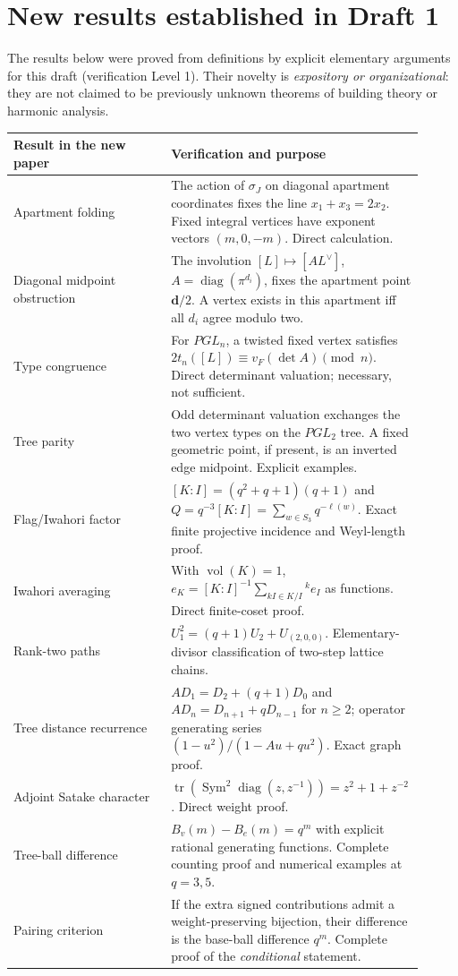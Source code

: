 \documentclass[12pt,letterpaper]{amsart}
\begin{document}
\section{New results established in Draft 1}
The results below were proved from definitions by explicit elementary
arguments for this draft (verification Level 1). Their novelty is
\emph{expository or organizational}: they are not claimed to be
previously unknown theorems of building theory or harmonic analysis.
\begin{longtable}{@{}p{0.38\linewidth}p{0.53\linewidth}@{}}
\toprule
Result in the new paper & Verification and purpose\\
\midrule
\endhead
Apartment folding & The action of $\sigma_J$ on diagonal apartment
coordinates fixes the line $x_1+x_3=2x_2$. Fixed integral vertices
have exponent vectors $(m,0,-m)$. Direct calculation.\\
Diagonal midpoint obstruction & The involution
$[L]\mapsto[A L^\vee]$, $A=\operatorname{diag}(\pi^{d_i})$,
fixes the apartment point $\boldsymbol d/2$. A vertex exists
in this apartment iff all $d_i$ agree modulo two.\\
Type congruence & For $PGL_n$, a twisted fixed vertex satisfies
$2t_n([L])\equiv v_F(\det A)\pmod n$. Direct determinant
valuation; necessary, not sufficient.\\
Tree parity & Odd determinant valuation exchanges the two
vertex types on the $PGL_2$ tree. A fixed geometric point,
if present, is an inverted edge midpoint. Explicit examples.\\
Flag/Iwahori factor & $[K:I]=(q^2+q+1)(q+1)$ and
$Q=q^{-3}[K:I]=\sum_{w\in S_3}q^{-\ell(w)}$.
Exact finite projective incidence and Weyl-length proof.\\
Iwahori averaging & With $\operatorname{vol}(K)=1$,
$e_K=[K:I]^{-1}\sum_{kI\in K/I}{}^ke_I$ as functions.
Direct finite-coset proof.\\
Rank-two paths & $U_1^2=(q+1)U_2+U_{(2,0,0)}$.
Elementary-divisor classification of two-step lattice chains.\\
Tree distance recurrence & $AD_1=D_2+(q+1)D_0$ and
$AD_n=D_{n+1}+qD_{n-1}$ for $n\geq2$; operator generating
series $(1-u^2)/(1-Au+qu^2)$. Exact graph proof.\\
Adjoint Satake character & $\operatorname{tr}(\operatorname{Sym}^2
\operatorname{diag}(z,z^{-1}))=z^2+1+z^{-2}$. Direct weight proof.\\
Tree-ball difference & $B_v(m)-B_e(m)=q^m$ with explicit
rational generating functions. Complete counting proof and
numerical examples at $q=3,5$.\\
Pairing criterion & If the extra signed contributions admit a
weight-preserving bijection, their difference is the base-ball
difference $q^m$. Complete proof of the \emph{conditional} statement.\\
\bottomrule
\end{longtable}
\end{document}
